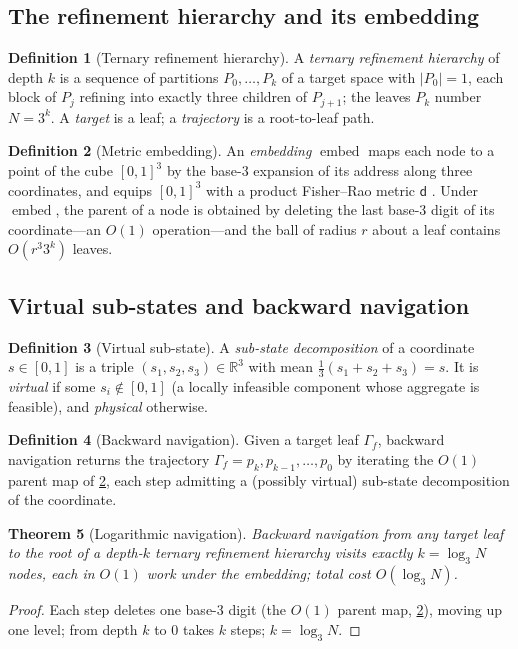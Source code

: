 \documentclass[11pt,a4paper]{article}
\theoremstyle{plain}
\newtheorem{theorem}{Theorem}[section]
\theoremstyle{definition}
\newtheorem{definition}[theorem]{Definition}
\theoremstyle{remark}
\DeclareMathOperator{\emb}{embed}
\newcommand{\R}{\mathbb{R}}
\newcommand{\Unit}{[0,1]}
\newcommand{\dist}{\mathsf{d}}
\newcommand{\target}{\Gamma_{\!f}}
\begin{document}
\subsection{The refinement hierarchy and its embedding}

\begin{definition}[Ternary refinement hierarchy]
\label{def:hierarchy}
A \emph{ternary refinement hierarchy} of depth $k$ is a sequence of partitions
$P_0,\dots,P_k$ of a target space with $|P_0|=1$, each block of $P_j$ refining
into exactly three children of $P_{j+1}$; the leaves $P_k$ number $N=3^{k}$. A
\emph{target} is a leaf; a \emph{trajectory} is a root-to-leaf path.
\end{definition}

\begin{definition}[Metric embedding]
\label{def:embedding}
An \emph{embedding} $\emb$ maps each node to a point of the cube $\Unit^{3}$ by
the base-3 expansion of its address along three coordinates, and equips
$\Unit^{3}$ with a product Fisher--Rao metric $\dist$
\citep{amari2016,cencov1982}. Under $\emb$, the parent of a node is obtained by
deleting the last base-3 digit of its coordinate---an $O(1)$ operation---and the
ball of radius $r$ about a leaf contains $O(r^{3}3^{k})$ leaves.
\end{definition}

\subsection{Virtual sub-states and backward navigation}

\begin{definition}[Virtual sub-state]
\label{def:virtual}
A \emph{sub-state decomposition} of a coordinate $s\in\Unit$ is a triple
$(s_1,s_2,s_3)\in\R^{3}$ with mean $\tfrac13(s_1+s_2+s_3)=s$. It is
\emph{virtual} if some $s_i\notin\Unit$ (a locally infeasible component whose
aggregate is feasible), and \emph{physical} otherwise.
\end{definition}

\begin{definition}[Backward navigation]
\label{def:backnav}
Given a target leaf $\target$, backward navigation returns the trajectory
$\target=p_k,p_{k-1},\dots,p_0$ by iterating the $O(1)$ parent map of
\cref{def:embedding}, each step admitting a (possibly virtual) sub-state
decomposition of the coordinate.
\end{definition}

\begin{theorem}[Logarithmic navigation]
\label{thm:lognav}
Backward navigation from any target leaf to the root of a depth-$k$ ternary
refinement hierarchy visits exactly $k=\log_3 N$ nodes, each in $O(1)$ work
under the embedding; total cost $O(\log_3 N)$.
\end{theorem}
\begin{proof}
Each step deletes one base-3 digit (the $O(1)$ parent map, \cref{def:embedding}),
moving up one level; from depth $k$ to $0$ takes $k$ steps; $k=\log_3 N$.
\end{proof}
\end{document}
